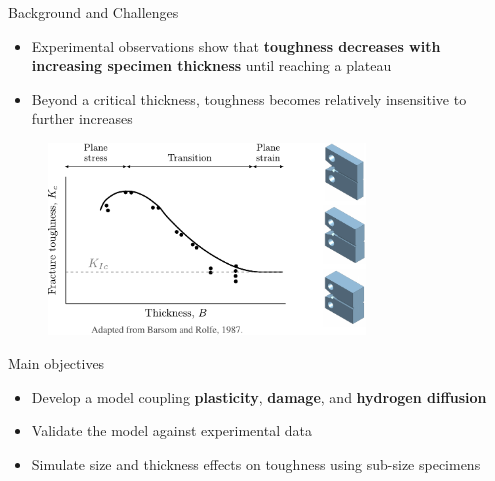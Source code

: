 \documentclass[9pt]{beamer}
\begin{document}
\begin{frame}{Background and Challenges}

\begin{itemize}
    \item Experimental observations show that \textbf{toughness decreases with increasing specimen thickness} until reaching a plateau
    \vspace{0.15cm}
    \item Beyond a critical thickness, toughness becomes relatively insensitive to further increases
\end{itemize}

\begin{figure}
    \centering
    \includegraphics[width=0.75\textwidth]{Images/plateau_plane_strain.pdf}
\end{figure}


\end{frame}


\begin{frame}{Main objectives}

\begin{itemize}
    \item Develop a model coupling \textbf{plasticity}, \textbf{damage}, and \textbf{hydrogen diffusion}
    \vspace{0.15cm}
    \item Validate the model against experimental data
    \vspace{0.15cm}
    \item Simulate size and thickness effects on toughness using sub-size specimens
\end{itemize}


\end{frame}
\end{document}
